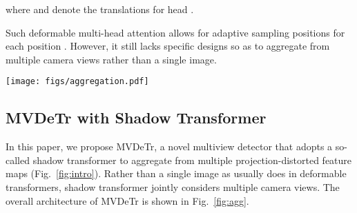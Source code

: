 \documentclass[sigconf,authorversion,nonacm]{acmart}
\begin{document}
where  and  denote the translations for head . 

Such deformable multi-head attention allows for adaptive sampling positions  for each position .
However, it still lacks specific designs so as to aggregate from multiple camera views rather than a single image. 






\begin{figure*}[h]
  \centering
  \texttt{[image: figs/aggregation.pdf]}
  \caption{
  Multiview aggregation in MVDeTr. 
  Given input images from  cameras, first, MVDeTr extracts image feature maps. Next, MVDeTr projects the feature maps onto the ground plane. Then, we adopt a shadow transformer to deal with the various shadow-like distortion patterns introduced by the perspective transformation. Last, we aggregate the output feature maps to formulate a final representation for the entire scenario. 
  Specifically, inside this shadow transformer, we use multiview deformable attention (an extension to the deformable attention \cite{zhu2021deformable}) to build an encoder for multiview processing and aggregation.
  To start with, we translate each of the projected feature maps  into  heads. After that, at each position , we estimate the position offsets of  reference points  to attend on, and estimate their corresponding attention weights  (). Different from the original deformable transformer design, we consider all different cameras and  heads for each camera (which makes a total number of  reference points for each location in each camera) for the multi-head attention, so as to infuse the multiview information to each of the views.
  }
  \label{fig:agg}
\end{figure*}







\subsection{MVDeTr with Shadow Transformer}
In this paper, we propose MVDeTr, a novel multiview detector that adopts a so-called shadow transformer to aggregate from multiple projection-distorted feature maps (Fig.~\ref{fig:intro}). Rather than a single image as usually does in deformable transformers, shadow transformer jointly considers multiple camera views. 
The overall architecture of MVDeTr is shown in Fig.~\ref{fig:agg}.
\end{document}
